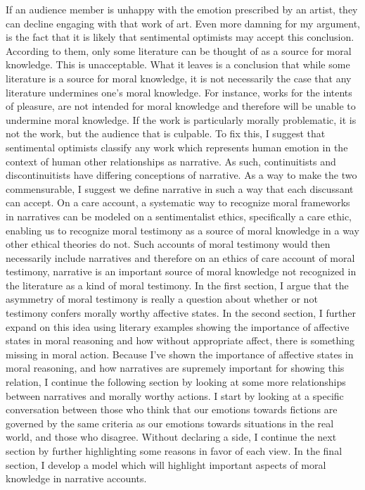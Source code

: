 \documentclass[
  12pt,
]{book}
\theoremstyle{definition}
\theoremstyle{definition}
\theoremstyle{definition}
\theoremstyle{definition}
\theoremstyle{remark}
\begin{document}
If an audience member is unhappy with the emotion prescribed by an artist, they can decline engaging with that work of art. Even more damning for my argument, is the fact that it is likely that sentimental optimists may accept this conclusion. According to them, only some literature can be thought of as a source for moral knowledge. This is unacceptable. What it leaves is a conclusion that while some literature is a source for moral knowledge, it is not necessarily the case that any literature undermines one's moral knowledge. For instance, works for the intents of pleasure, are not intended for moral knowledge and therefore will be unable to undermine moral knowledge. If the work is particularly morally problematic, it is not the work, but the audience that is culpable. To fix this, I suggest that sentimental optimists classify any work which represents human emotion in the context of human other relationships as narrative. As such, continuitists and discontinuitists have differing conceptions of narrative. As a way to make the two commensurable, I suggest we define narrative in such a way that each discussant can accept. On a care account, a systematic way to recognize moral frameworks in narratives can be modeled on a sentimentalist ethics, specifically a care ethic, enabling us to recognize moral testimony as a source of moral knowledge in a way other ethical theories do not. Such accounts of moral testimony would then necessarily include narratives and therefore on an ethics of care account of moral testimony, narrative is an important source of moral knowledge not recognized in the literature as a kind of moral testimony. In the first section, I argue that the asymmetry of moral testimony is really a question about whether or not testimony confers morally worthy affective states. In the second section, I further expand on this idea using literary examples showing the importance of affective states in moral reasoning and how without appropriate affect, there is something missing in moral action. Because I've shown the importance of affective states in moral reasoning, and how narratives are supremely important for showing this relation, I continue the following section by looking at some more relationships between narratives and morally worthy actions. I start by looking at a specific conversation between those who think that our emotions towards fictions are governed by the same criteria as our emotions towards situations in the real world, and those who disagree. Without declaring a side, I continue the next section by further highlighting some reasons in favor of each view. In the final section, I develop a model which will highlight important aspects of moral knowledge in narrative accounts.
\end{document}
